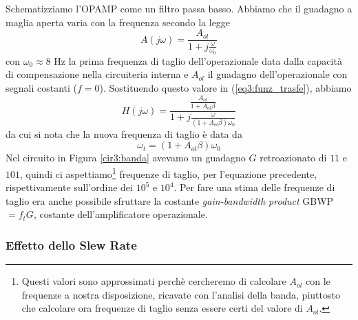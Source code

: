 Schematizziamo l'OPAMP come un filtro passa basso. Abbiamo che il guadagno a maglia aperta varia con la frequenza secondo la legge
\begin{equation}
A(j\omega)=\frac{A_{ol}}{1+j\frac{\omega}{\omega_0}}
\label{eq3:passa_basso}
\end{equation}
con $\omega_0 \approx 8$ \si{\hertz} la prima frequenza di taglio dell'operazionale data dalla capacità di compensazione nella circuiteria interna e $A_{ol}$ il guadagno dell'operazionale con segnali costanti ($f = 0$). Sostituendo questo valore in (\ref{eq3:funz_trasfe}), abbiamo
\begin{equation}
H(j\omega)=\frac{\frac{A_{ol}}{1+A_{ol}\beta}}{1+j \frac{\omega}{(1+A_{ol}\beta)\omega_0}}
\label{eq3:funzione_trasferimento}
\end{equation}
da cui si nota che la nuova frequenza di taglio è data da
\begin{equation}
\omega_t=(1+A_{ol}\beta)\omega_0
\label{eq3:freq_taglio}
\end{equation}
Nel circuito in Figura \ref{cir3:banda} avevamo un guadagno $G$ retroazionato di $11$ e $101$, quindi ci aspettiamo\footnote{Questi valori sono approssimati perchè cercheremo di calcolare $A_{ol}$ con le frequenze a nostra disposizione, ricavate con l'analisi della banda, piuttosto che calcolare ora frequenze di taglio senza essere certi del valore di $A_{ol}$.} frequenze di taglio, per l'equazione precedente, rispettivamente sull'ordine dei $10^5$ e $10^4$. Per fare una stima delle frequenze di taglio era anche possibile sfruttare la costante \textit{gain-bandwidth product} GBWP $=f_t G$, costante dell'amplificatore operazionale.

\subsubsection*{Effetto dello Slew Rate}

